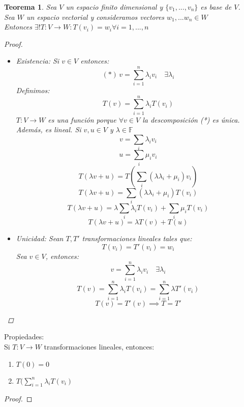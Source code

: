 \documentclass[11pt]{book}
\newtheorem{thm}{Teorema}[section]
\theoremstyle{definition}
\begin{document}
\begin{thm}
Sea $V$ un espacio finito dimensional y $\{v_1,...,v_n\}$ es base de $V$.\\
Sea $W$ un espacio vectorial y consideramos vectores $w_1,...w_n\in W$\\
Entonces $\exists !T:V\rightarrow W: T(v_i)=w_i\forall i=1,...,n$
\begin{proof}
\begin{itemize}
	\item Existencia: Si $v\in V$ entonces:
	\[(*)\, v=\sum^n_{i=1}\lambda_i v_i\quad \exists \lambda_i\]
	Definimos:
	\[T(v)=\sum^n_{i=1}\lambda_i T(v_i)\]
	$T:V\rightarrow W$ es una función porque $\forall v\in V$ la descomposición (*) es única.\\
	Además, es lineal. Si $v,u\in V$ y $\lambda\in\mathbb{F}$
	\[v=\sum_i \lambda_i v_i\]
	\[u=\sum_i\mu_i v_i\]
	\[T(\lambda v+u)=T(\sum_i(\lambda\lambda_i+\mu_i)v_i)\]
	\[T(\lambda v+u)=\sum_i(\lambda\lambda_i+\mu_i)T(v_i)\]
	\[T(\lambda v+u)=\lambda\sum_i\lambda_i T(v_i)+\sum_i\mu_i T(v_i)\]
	\[T(\lambda v+u)=\lambda T(v)+T(u)\]
	\item Unicidad: Sean $T,T'$ transformaciones lineales tales que:
	\[T(v_i)=T'(v_i)=w_i\]
	Sea $v\in V$, entonces:
	\[v=\sum^n_{i=1}\lambda_i v_i\quad \exists \lambda_i\]
	\[T(v)=\sum^n_{i=1}\lambda_i T(v_i)=\sum^n_{i=1}\lambda T'(v_i)\]
	\[T(v)=T'(v)\implies T=T'\]
\end{itemize}
\end{proof}
\end{thm}
Propiedades:\\
Si $T:V\rightarrow W$ transformaciones lineales, entonces:
\begin{enumerate}
	\item $T(0)=0$
	
	\item $T(\sum^n_{i=1}\lambda_iT(v_i)$
\end{enumerate}
\begin{proof}

\end{proof}
\end{document}
